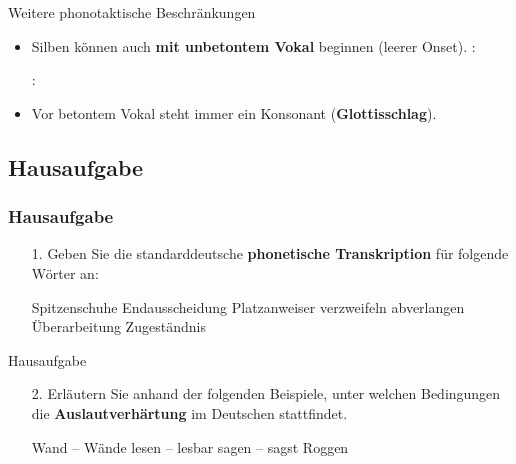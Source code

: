 \begin{frame}{Weitere phonotaktische Beschränkungen}
	
\begin{itemize}	
	\item Silben können auch \textbf{mit unbetontem Vokal} beginnen (\ras leerer Onset).
	\ea {}: 
	\z
	
	\ea {}:  
	\z

\pause 
	
	\item Vor betontem Vokal steht immer ein Konsonant (\textbf{Glottisschlag}).
	
	\ea
	\z

\end{itemize}

\end{frame}


\subsection{Hausaufgabe}

\begin{frame}
\frametitle{Hausaufgabe}

\begin{itemize}
	\item[1.]{Geben Sie die standarddeutsche \textbf{phonetische Transkription} für folgende Wörter an:}
	
	\eal \label{ex:03bHA1}
	\ex Spitzenschuhe
	\ex Endausscheidung
	\ex Platzanweiser
	\ex verzweifeln
	\ex abverlangen
	\ex Überarbeitung
	\ex Zugeständnis
	\zl
\end{itemize}

\end{frame}

\begin{frame}{Hausaufgabe}

\begin{itemize}
\item[2.]{Erläutern Sie anhand der folgenden Beispiele, unter welchen Bedingungen die \textbf{Auslautverhärtung} im Deutschen stattfindet.}

\eal \label{ex:03bHA2}
\ex Wand -- Wände
\ex lesen -- lesbar
\ex sagen -- sagst
\ex Roggen
\zl

\end{itemize}

\end{frame}

